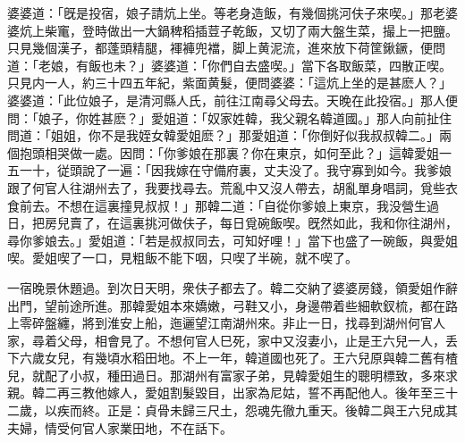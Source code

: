 婆婆道：「旣是投宿，娘子請炕上坐。等老身造飯，有幾個挑河伕子來喫。」那老婆婆炕上柴竃，登時做出一大鍋稗稻插荳子乾飯，又切了兩大盤生菜，撮上一把鹽。只見幾個漢子，都蓬頭精腿，褌褲兜襠，脚上黄泥流，進來放下荷筐鍬鐝，便問道：「老娘，有飯也未？」婆婆道：「你們自去盛喫。」當下各取飯菜，四散正喫。只見内一人，約三十四五年紀，紫面黄髮，便問婆婆：「這炕上坐的是甚麽人？」婆婆道：「此位娘子，是清河縣人氏，前往江南尋父母去。天晚在此投宿。」那人便問：「娘子，你姓甚麽？」愛姐道：「奴家姓韓，我父親名韓道國。」那人向前扯住問道：「姐姐，你不是我姪女韓愛姐麽？」那愛姐道：「你倒好似我叔叔韓二。」兩個抱頭相哭做一處。因問：「你爹娘在那裏？你在東京，如何至此？」這韓愛姐一五一十，従頭說了一遍：「因我嫁在守備府裏，丈夫没了。我守寡到如今。我爹娘跟了何官人往湖州去了，我要找尋去。荒亂中又沒人帶去，胡亂單身唱詞，覓些衣食前去。不想在這裏撞見叔叔！」那韓二道：「自從你爹娘上東京，我没營生過日，把房兒賣了，在這裏挑河做伕子，每日覓碗飯喫。旣然如此，我和你往湖州，尋你爹娘去。」愛姐道：「若是叔叔同去，可知好哩！」當下也盛了一碗飯，與愛姐喫。愛姐喫了一口，見粗飯不能下咽，只喫了半碗，就不喫了。

一宿晚景休題過。到次日天明，衆伕子都去了。韓二交納了婆婆房錢，領愛姐作辭出門，望前途所進。那韓愛姐本來嬌嫩，弓鞋又小，身邊帶着些細軟釵梳，都在路上零碎盤纏，將到淮安上船，迤邐望江南湖州來。非止一日，找尋到湖州何官人家，尋着父母，相會見了。不想何官人巳死，家中又沒妻小，止是王六兒一人，丢下六歲女兒，有幾頃水稻田地。不上一年，韓道國也死了。王六兒原與韓二舊有楂兒，就配了小叔，種田過日。那湖州有富家子弟，見韓愛姐生的聰明標致，多來求親。韓二再三教他嫁人，愛姐割髮毀目，出家為尼姑，誓不再配他人。後年至三十二歲，以疾而終。正是：貞骨未歸三尺土，怨魂先徹九重天。後韓二與王六兒成其夫婦，情受何官人家業田地，不在話下。

